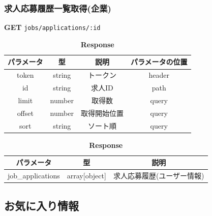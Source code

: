\subsubsection*{求人応募履歴一覧取得(企業)}
\textbf{GET} \texttt{jobs/applications/:id}
\begin{table}[H]
  \begin{minipage}
    {0.5\hsize}
    \centering
    \captionsetup{labelformat=empty,labelsep=none}
    \caption{\textbf{Request}}
    \small
    \begin{tabular}{|c|c|c|c|} \hline
      パラメータ  & 型      & 説明     & パラメータの位置 \\ \hline \hline
      token  & string & トークン   & header   \\ \hline
      id     & string & 求人ID   & path     \\ \hline
      limit  & number & 取得数    & query    \\ \hline
      offset & number & 取得開始位置 & query    \\ \hline
      sort   & string & ソート順   & query    \\ \hline
    \end{tabular}
  \end{minipage}
  \begin{minipage}
    {0.5\hsize}
    \centering
    \captionsetup{labelformat=empty,labelsep=none}
    \caption{\textbf{Response}}
    \begin{tabular}{|c|c|c|} \hline
      パラメータ             & 型             & 説明             \\ \hline \hline
      job\_applications & array[object] & 求人応募履歴(ユーザー情報) \\ \hline
    \end{tabular}
  \end{minipage}
\end{table}
\hrulefill
\subsection{お気に入り情報}
